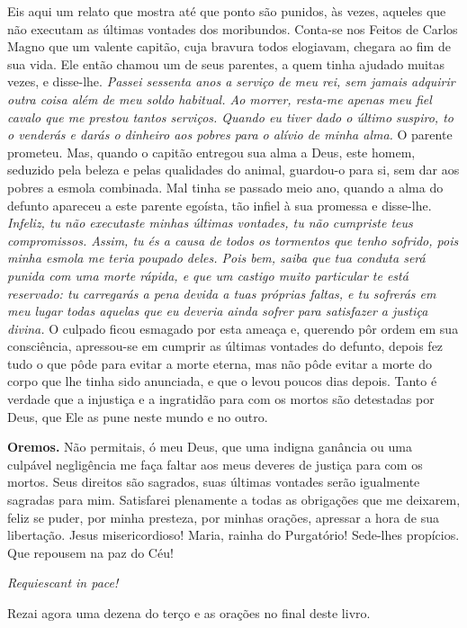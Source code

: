 Eis aqui um relato que mostra até que ponto são punidos, às vezes, aqueles que não executam as últimas vontades dos moribundos. Conta-se nos Feitos de Carlos Magno que um valente capitão, cuja bravura todos elogiavam, chegara ao fim de sua vida. Ele então chamou um de seus parentes, a quem tinha ajudado muitas vezes, e disse-lhe. \textit{Passei sessenta anos a serviço de meu rei, sem jamais adquirir outra coisa além de meu soldo habitual. Ao morrer, resta-me apenas meu fiel cavalo que me prestou tantos serviços. Quando eu tiver dado o último suspiro, to o venderás e darás o dinheiro aos pobres para o alívio de minha alma.} O parente prometeu. Mas, quando o capitão entregou sua alma a Deus, este homem, seduzido pela beleza e pelas qualidades do animal, guardou-o para si, sem dar aos pobres a esmola combinada. Mal tinha se passado meio ano, quando a alma do defunto apareceu a este parente egoísta, tão infiel à sua promessa e disse-lhe. \textit{Infeliz, tu não executaste minhas últimas vontades, tu não cumpriste teus compromissos. Assim, tu és a causa de todos os tormentos que tenho sofrido, pois minha esmola me teria poupado deles. Pois bem, saiba que tua conduta será punida com uma morte rápida, e que um castigo muito particular te está reservado: tu carregarás a pena devida a tuas próprias faltas, e tu sofrerás em meu lugar todas aquelas que eu deveria ainda sofrer para satisfazer a justiça divina.} O culpado ficou esmagado por esta ameaça e, querendo pôr ordem em sua consciência, apressou-se em cumprir as últimas vontades do defunto, depois fez tudo o que pôde para evitar a morte eterna, mas não pôde evitar a morte do corpo que lhe tinha sido anunciada, e que o levou poucos dias depois. Tanto é verdade que a injustiça e a ingratidão para com os mortos são detestadas por Deus, que Ele as pune neste mundo e no outro.


\vspace{\baselineskip}\noindent \textbf{Oremos.} Não permitais, ó meu Deus, que uma indigna ganância ou uma culpável negligência me faça faltar aos meus deveres de justiça para com os mortos. Seus direitos são sagrados, suas últimas vontades serão igualmente sagradas para mim. Satisfarei plenamente a todas as obrigações que me deixarem, feliz se puder, por minha presteza, por minhas orações, apressar a hora de sua libertação. Jesus misericordioso! Maria, rainha do Purgatório! Sede-lhes propícios. Que repousem na paz do Céu!



\begin{center}
\textit{Requiescant in pace!}
\end{center}

Rezai agora uma dezena do terço e as orações no final deste livro.
